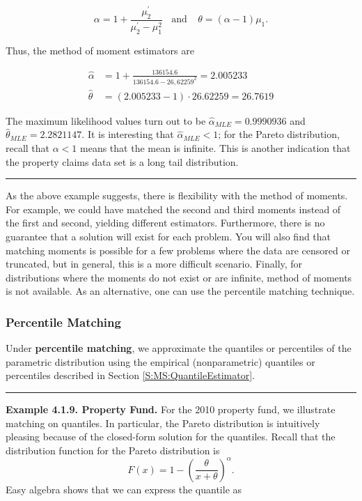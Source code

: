 \documentclass[]{book}
\theoremstyle{definition}
\theoremstyle{definition}
\theoremstyle{definition}
\theoremstyle{remark}
\begin{document}
\[\alpha = 1+ \frac{\mu_2^{\prime}}{\mu_2^{\prime}-\mu_1^2} \ \ \ \
\text{and} \ \ \ \ \
 \theta = (\alpha-1)\mu_1.\]

Thus, the method of moment estimators are

\[\begin{aligned}
\hat{\alpha} &=  1+ \frac{136154.6}{136154.6-26,62259^2} = 2.005233 \\
\hat{\theta} &=  (2.005233-1) \cdot 26.62259 = 26.7619
\end{aligned}\]

The maximum likelihood values turn out to be
\(\hat{\alpha}_{MLE} = 0.9990936\) and
\(\hat{\theta}_{MLE} = 2.2821147\). It is interesting that
\(\hat{\alpha}_{MLE}<1\); for the Pareto distribution, recall that
\(\alpha <1\) means that the mean is infinite. This is another
indication that the property claims data set is a long tail
distribution.

\begin{center}\rule{0.5\linewidth}{\linethickness}\end{center}

As the above example suggests, there is flexibility with the method of
moments. For example, we could have matched the second and third moments
instead of the first and second, yielding different estimators.
Furthermore, there is no guarantee that a solution will exist for each
problem. You will also find that matching moments is possible for a few
problems where the data are censored or truncated, but in general, this
is a more difficult scenario. Finally, for distributions where the
moments do not exist or are infinite, method of moments is not
available. As an alternative, one can use the percentile matching
technique.

\subsubsection{Percentile Matching}\label{percentile-matching}

Under \textbf{percentile matching}, we approximate the quantiles or
percentiles of the parametric distribution using the empirical
(nonparametric) quantiles or percentiles described in Section
\ref{S:MS:QuantileEstimator}.

\begin{center}\rule{0.5\linewidth}{\linethickness}\end{center}

\textbf{Example 4.1.9. Property Fund.} For the 2010 property fund, we
illustrate matching on quantiles. In particular, the Pareto distribution
is intuitively pleasing because of the closed-form solution for the
quantiles. Recall that the distribution function for the Pareto
distribution is
\[F(x) = 1 - \left(\frac{\theta}{x+\theta}\right)^{\alpha}.\] Easy
algebra shows that we can express the quantile as
\end{document}

